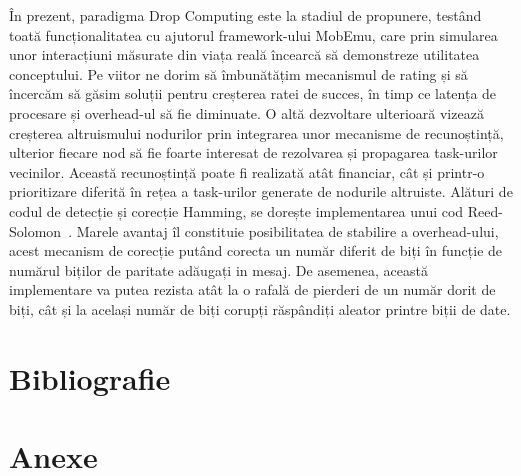 \documentclass[12pt,a4paper]{report}
\begin{document}
În prezent, paradigma Drop Computing este la stadiul de propunere, testând toată funcționalitatea cu ajutorul framework-ului MobEmu, care prin simularea unor interacțiuni măsurate din viața reală încearcă să demonstreze utilitatea conceptului. Pe viitor ne dorim să îmbunătățim mecanismul de rating și să încercăm să găsim soluții pentru creșterea ratei de succes, în timp ce latența de procesare și overhead-ul să fie diminuate. O altă dezvoltare ulterioară vizează creșterea altruismului nodurilor prin integrarea unor mecanisme de recunoștință, ulterior fiecare nod să fie foarte interesat de rezolvarea și propagarea task-urilor vecinilor. Această recunoștință poate fi realizată atât financiar, cât și printr-o prioritizare diferită în rețea a task-urilor generate de nodurile altruiste.
Alături de codul de detecție și corecție Hamming, se dorește implementarea unui cod Reed-Solomon~\cite{reedSolomon}. Marele avantaj îl constituie posibilitatea de stabilire a overhead-ului, acest mecanism de corecție putând corecta un număr diferit de biți în funcție de numărul biților de paritate adăugați in mesaj. De asemenea, această implementare va putea rezista atât la o rafală de pierderi de un număr dorit de biți, cât și la același număr de biți corupți răspândiți aleator printre biții de date.


\chapter{Bibliografie} \label{bibliografie}





\chapter{Anexe} \label{anexe}
\newlength\someheight
\setlength\someheight{3cm}
\end{document}
